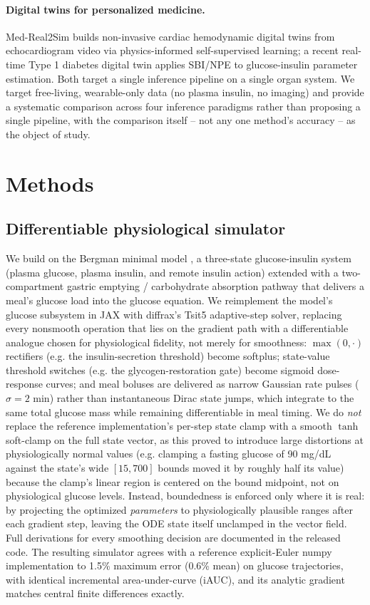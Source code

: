 \documentclass[letterpaper]{article} %
\begin{document}
\paragraph{Digital twins for personalized medicine.} Med-Real2Sim \citep{kuang2024medreal2sim}
builds non-invasive cardiac hemodynamic digital twins from echocardiogram video via physics-informed
self-supervised learning; a recent real-time Type 1 diabetes digital twin
\citep{hoang2025t1dsbi} applies SBI/NPE to glucose-insulin parameter estimation. Both target a
single inference pipeline on a single organ system. We target free-living, wearable-only data (no
plasma insulin, no imaging) and provide a systematic comparison across four inference paradigms
rather than proposing a single pipeline, with the comparison itself -- not any one method's
accuracy -- as the object of study.

\section{Methods}

\subsection{Differentiable physiological simulator}
We build on the Bergman minimal model \citep{bergman1979}, a three-state glucose-insulin system
(plasma glucose, plasma insulin, and remote insulin action) extended with a two-compartment gastric
emptying / carbohydrate absorption pathway that delivers a meal's glucose load into the glucose
equation. We reimplement the model's glucose subsystem in JAX \citep{bradbury2018jax} with
diffrax's \citep{kidger2021diffrax} Tsit5 adaptive-step
solver, replacing every nonsmooth operation that lies on the gradient path with a differentiable
analogue chosen for physiological fidelity, not merely for smoothness: $\max(0,\cdot)$ rectifiers
(e.g. the insulin-secretion threshold) become softplus; state-value threshold switches (e.g. the
glycogen-restoration gate) become sigmoid dose-response curves; and meal boluses are delivered as
narrow Gaussian rate pulses ($\sigma=2$ min) rather than instantaneous Dirac state jumps, which
integrate to the same total glucose mass while remaining differentiable in meal timing. We do
\emph{not} replace the reference implementation's per-step state clamp with a smooth $\tanh$
soft-clamp on the full state vector, as this proved to introduce large distortions at
physiologically normal values (e.g. clamping a fasting glucose of 90 mg/dL against the state's
wide $[15,700]$ bounds moved it by roughly half its value) because the clamp's linear region is
centered on the bound midpoint, not on physiological glucose levels. Instead, boundedness is
enforced only where it is real: by projecting the optimized \emph{parameters} to physiologically
plausible ranges after each gradient step, leaving the ODE state itself unclamped in the vector
field. Full derivations for every smoothing decision are documented in the released code. The
resulting simulator agrees with a reference explicit-Euler numpy implementation to 1.5\% maximum
error (0.6\% mean) on glucose trajectories, with identical incremental area-under-curve (iAUC), and
its analytic gradient matches central finite differences exactly.
\end{document}
